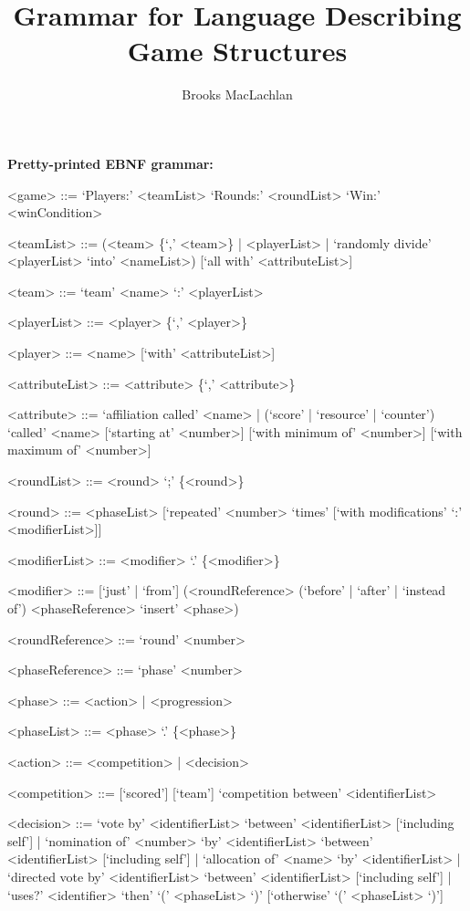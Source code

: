 \documentclass{article}
\title{Grammar for Language Describing Game Structures}
\author{Brooks MacLachlan}
\begin{document}
\maketitle

\noindent \textbf{Pretty-printed EBNF grammar:}
\begin{grammar}
<game> ::= `Players:' <teamList> `Rounds:' <roundList> `Win:' 
<winCondition>

<teamList> ::= (<team> \{`,' <team>\} | <playerList> | `randomly divide' 
<playerList> `into' <nameList>) [`all with' <attributeList>]

<team> ::= `team' <name> `:' <playerList>

<playerList> ::= <player> \{`,' <player>\}

<player> ::= <name> [`with' <attributeList>]

<attributeList> ::= <attribute> \{`,' <attribute>\}

<attribute> ::= `affiliation called' <name> | (`score' | `resource' | 
`counter') `called'
<name> [`starting at' <number>] [`with minimum of' <number>] [`with maximum of' 
<number>]

<roundList> ::= <round> `;' \{<round>\}

<round> ::= <phaseList> [`repeated' <number> `times' [`with modifications' `:' 
<modifierList>]]

<modifierList> ::= <modifier> `.' \{<modifier>\}

<modifier> ::= [`just' | `from'] (<roundReference> (`before' | `after' | 
`instead of') 
<phaseReference> `insert' <phase>)

<roundReference> ::= `round' <number>

<phaseReference> ::= `phase' <number>

<phase> ::= <action> | <progression>

<phaseList> ::= <phase> `.' \{<phase>\}

<action> ::= <competition> | <decision>

<competition> ::= [`scored'] [`team'] `competition between' <identifierList>

<decision> ::= `vote by' <identifierList> `between' 
<identifierList> [`including self'] | `nomination of' <number> `by' 
<identifierList> `between' <identifierList> [`including self'] | 
`allocation of' <name> `by' <identifierList> | `directed vote by'
<identifierList> `between' <identifierList> [`including self'] | `uses?'
<identifier> `then' `(' <phaseList> `)' [`otherwise' `(' <phaseList> `)']


\end{grammar}
\end{document}

